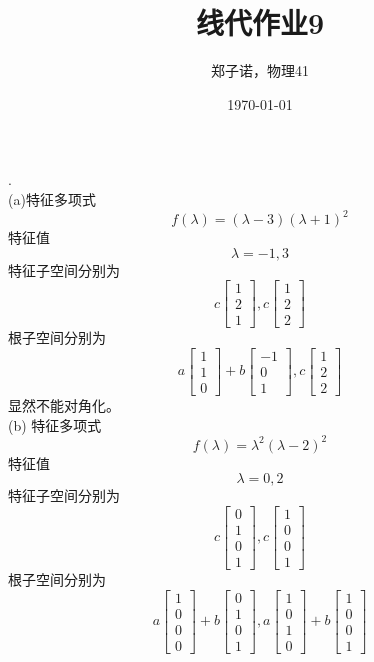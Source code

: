 \documentclass[utf8]{ctexart}
\title{线代作业9}
\author{郑子诺，物理41}
\date{\today}
\begin{document}
\maketitle
{}.\\
(a)特征多项式
\[f(\lambda)=(\lambda-3)(\lambda+1)^2\]
特征值
\[\lambda=-1,3\]
特征子空间分别为
\[c\begin{bmatrix}
	1\\
	2\\
	1
\end{bmatrix},c\begin{bmatrix}
1\\
2\\
2
\end{bmatrix}\]
根子空间分别为
\[a\begin{bmatrix}
1\\
1\\
0
\end{bmatrix}+b\begin{bmatrix}
-1\\
0\\
1
\end{bmatrix},c\begin{bmatrix}
1\\
2\\
2
\end{bmatrix}\]
显然不能对角化。\\
(b)
特征多项式
\[f(\lambda)=\lambda^2(\lambda-2)^2\]
特征值
\[\lambda=0,2\]
特征子空间分别为
\[c\begin{bmatrix}
	0\\
	1\\
	0\\
	1
\end{bmatrix},c\begin{bmatrix}
1\\
0\\
0\\
1
\end{bmatrix}\]
根子空间分别为
\[a\begin{bmatrix}
	1\\
	0\\
	0\\
	0
\end{bmatrix}+b\begin{bmatrix}
0\\
1\\
0\\
1
\end{bmatrix},a\begin{bmatrix}
1\\
0\\
1\\
0
\end{bmatrix}+b\begin{bmatrix}
1\\
0\\
0\\
1
\end{bmatrix}\]
\end{document}
